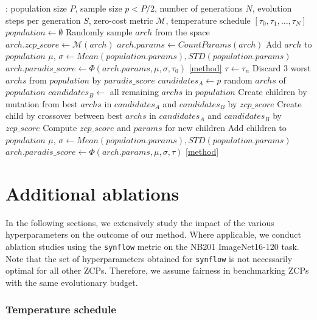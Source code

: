 \documentclass[10pt]{article} %
\begin{document}
\begin{algorithm}[ht]
\caption{\underline{\textbf{Para}}meter \underline{\textbf{Dis}}tribution Shift NAS (\textbf{ParaDis})}
\label{alg_paradis}
\begin{algorithmic}[1]
\Require: population size $P$, sample size $p < P/2$, number of generations $N$, evolution steps per generation $S$, zero-cost metric $\mathcal{M}$, temperature schedule $[\tau_0, \tau_1, \dots, \tau_N]$
\State $population \gets \emptyset$
\State Randomly sample $arch$ from the space
\State $arch.zcp\_score \gets \mathcal{M}(arch)$
\State $arch.params \gets CountParams(arch)$
\State Add $arch$ to $population$
\EndWhile
\State $\mu$, $\sigma \gets Mean(population.params), STD(population.params)$
\State $arch.paradis\_score \gets \Phi(arch.params, \mu, \sigma, \tau_0)$ \ref{method}
\EndFor
{}
\State $\tau \gets \tau_n$
\State Discard 3 worst $archs$ from $population$ by $paradis\_score$
\State $candidates_A \gets p$ random $archs$ of $population$
\State $candidates_B \gets$ all remaining $archs$ in $population$
\State Create children by mutation from best $archs$ in $candidates_A$ and $candidates_B$ by $zcp\_score$
\State Create child by crossover between best $archs$ in $candidates_A$ and $candidates_B$ by $zcp\_score$
\State Compute $zcp\_score$ and $params$ for new children
\State Add children to $population$
\EndFor
\State $\mu$, $\sigma \gets Mean(population.params), STD(population.params)$
\State $arch.paradis\_score \gets \Phi(arch.params, \mu, \sigma, \tau)$ \ref{method}
\EndFor
\EndFor
\end{algorithmic}
\end{algorithm}

\section{Additional ablations}

In the following sections, we extensively study the impact of the various hyperparameters on the outcome of our method. Where applicable, we conduct ablation studies using the \texttt{synflow} metric on the NB201 ImageNet16-120 task. Note that the set of hyperparameters obtained for \texttt{synflow} is not necessarily optimal for all other ZCPs. Therefore, we assume fairness in benchmarking ZCPs with the same evolutionary budget.

\subsubsection{Temperature schedule}
\end{document}
